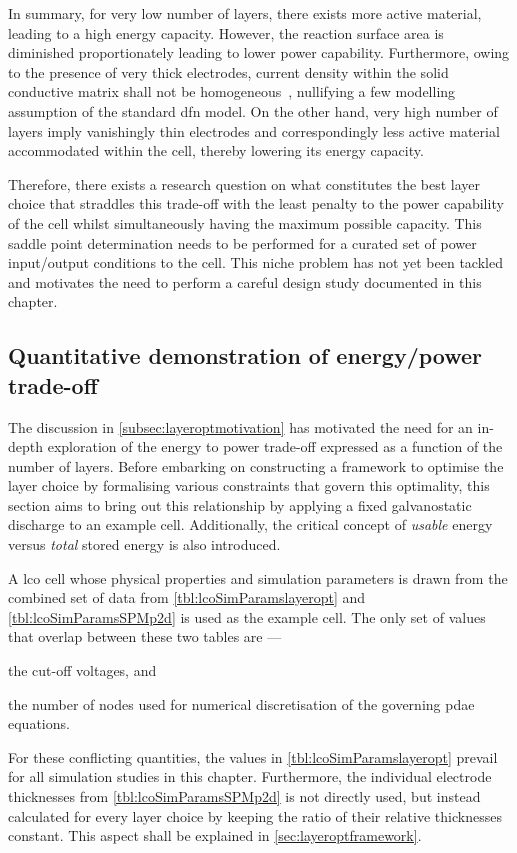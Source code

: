 In summary,  for very low number  of layers, there exists  more active material,
leading  to a  high  energy  capacity. However,  the  reaction  surface area  is
diminished proportionately leading to lower power capability. Furthermore, owing
to  the presence  of very  thick electrodes,  current density  within the  solid
conductive  matrix shall  not be  homogeneous~\cite{Pals1995}, nullifying  a few
modelling assumption  of the standard \gls{dfn}  model. On the other  hand, very
high number of layers imply vanishingly thin electrodes and correspondingly less
active  material  accommodated within  the  cell,  thereby lowering  its  energy
capacity.


Therefore, there exists  a research question on what constitutes  the best layer
choice  that straddles  this  trade-off  with the  least  penalty  to the  power
capability  of  the  cell  whilst simultaneously  having  the  maximum  possible
capacity. This  saddle point determination needs  to be performed for  a curated
set of power input/output conditions to the cell. This niche problem has not yet
been tackled and motivates the need to perform a careful design study documented
in this chapter.

\subsection{Quantitative demonstration of energy/power trade-off}\label{sec:energypowertradeoffdemo}

The discussion in \cref{subsec:layeroptmotivation} has motivated the need for an
in-depth exploration  of the energy to  power trade-off expressed as  a function
of  the number  of  layers.  Before embarking  on  constructing  a framework  to
optimise the  layer choice by  formalising various constraints that  govern this
optimality, this section aims to bring out this relationship by applying a fixed
galvanostatic discharge to  an example cell. Additionally,  the critical concept
of \emph{usable} energy versus \emph{total} stored energy is also introduced.

A  \gls{lco}  cell  whose  physical  properties  and  simulation  parameters  is
drawn from  the combined  set of  data from  \cref{tbl:lcoSimParamslayeropt} and
\cref{tbl:lcoSimParamsSPMp2d}  is used  as the  example  cell. The  only set  of
values that overlap between these two tables are ---
\begin{enumerate*}[label=\itshape\alph*\upshape)]
    \item the cut-off voltages, and
    \item the number of nodes  used for numerical  discretisation of  the governing  \gls{pdae} equations.
\end{enumerate*}
For these conflicting quantities,  the values in \cref{tbl:lcoSimParamslayeropt}
prevail for all simulation studies  in this chapter. Furthermore, the individual
electrode thicknesses  from \cref{tbl:lcoSimParamsSPMp2d} is not  directly used,
but  instead  calculated  for  every  layer  choice  by  keeping  the  ratio  of
their  relative  thicknesses  constant.  This   aspect  shall  be  explained  in
\cref{sec:layeroptframework}.


